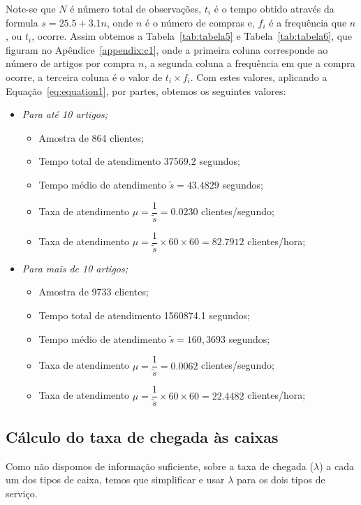 Note-se que $N$ é número total de observações, $t_i$ é o tempo obtido através
da formula $s=25.5+3.1n$, onde $n$ é o número de compras e, $f_i$ é a frequência
que $n$, ou $t_i$, ocorre. Assim obtemos a Tabela~\ref{tab:tabela5}
e Tabela~\ref{tab:tabela6}, que figuram no Apêndice~\ref{appendix:c1}, onde a primeira coluna corresponde ao número de
artigos por compra $n$, a segunda coluna a frequência em que a compra ocorre,
a terceira coluna é o valor de $t_i \times f_i$. Com estes valores, aplicando
a Equação~\ref{eq:equation1}, por partes, obtemos os seguintes valores:

\begin{itemize}
	\item \emph{Para até 10 artigos;}
		\begin{itemize}
			\item Amostra de 864 clientes;
			\item Tempo total de atendimento 37569.2 segundos;
			\item Tempo médio de atendimento $\tilde{s}=43.4829$ segundos;
			\item Taxa de atendimento $\mu=\dfrac{1}{\tilde{s}}=0.0230$
				clientes/segundo;
			\item Taxa de atendimento $\mu=\dfrac{1}{\tilde{s}} \times 60 \times
				60=82.7912$ clientes/hora;
		\end{itemize}

	\item \emph{Para mais de 10 artigos;}
		\begin{itemize}
			\item Amostra de 9733 clientes;
			\item Tempo total de atendimento 1560874.1 segundos;
			\item Tempo médio de atendimento $\tilde{s}=160,3693$ segundos;
			\item Taxa de atendimento $\mu=\dfrac{1}{\tilde{s}}=0.0062$
				clientes/segundo;
			\item Taxa de atendimento $\mu=\dfrac{1}{\tilde{s}} \times 60 \times
				60=22.4482$ clientes/hora;
		\end{itemize}
\end{itemize}


\subsection{Cálculo do taxa de chegada às caixas}

Como não dispomos de informação suficiente, sobre a taxa de chegada ($\lambda$)
a cada um dos tipos de caixa, temos que simplificar e usar $\lambda$ para os
dois tipos de serviço.

